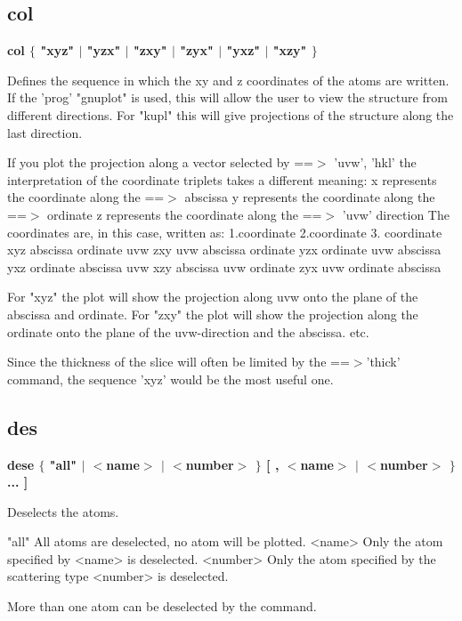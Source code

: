 \subsection*{col}
{\bf col $ \{$ "xyz" $| $ "yzx" $| $ "zxy" $| $ "zyx" $| $ "yxz" $| $ "xzy" $\} $ \par }
\par
\vspace{3pt}
Defines the sequence in which the xy and z coordinates of the atoms 
are written. 
If the 'prog' "gnuplot" is used, this will allow the user to view the 
structure from different directions. 
For "kupl" this will give projections of the structure along the last 
direction. 
\par
If you plot the projection along a vector selected by ==$> $ 'uvw', 'hkl' 
the interpretation of the coordinate triplets takes a different 
meaning: 
  x represents the coordinate along the ==$> $ abscissa 
  y represents the coordinate along the ==$> $ ordinate 
  z represents the coordinate along the ==$> $ 'uvw' direction 
The coordinates are, in this case, written as: 
      1.coordinate   2.coordinate   3. coordinate 
xyz   abscissa       ordinate       uvw 
zxy   uvw            abscissa       ordinate 
yzx   ordinate       uvw            abscissa 
yxz   ordinate       abscissa       uvw 
xzy   abscissa       uvw            ordinate 
zyx   uvw            ordinate       abscissa 
\par
For "xyz" the plot will show the projection along uvw onto the plane 
of the abscissa and ordinate. 
For "zxy" the plot will show the projection along the ordinate onto 
the plane of the uvw-direction and the abscissa. etc. 
\par
Since the thickness of the slice will often be limited by the 
==$> $'thick' command, the sequence 'xyz' would be the most useful one. 
\par
\subsection*{des}
{\bf dese $ \{$ "all" $| $ $ <$name$> $ $| $ $ <$number$> $ $\} $ [ , $ <$name$> $ $| $ $ <$number$> $ $\} $ ... ] \par }
\par
\vspace{3pt}
Deselects the atoms. 
\par
\begin{MacVerbatim}
"all"     All atoms are deselected, no atom will be plotted.
<name>    Only the atom specified by <name> is deselected.
<number>  Only the atom specified by the scattering type <number> is
          deselected.
\end{MacVerbatim}
More than one atom can be deselected by the command. 
